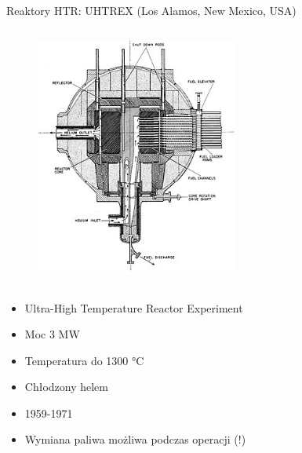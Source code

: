 \begin{columnframe}{Reaktory HTR: UHTREX (Los Alamos, New Mexico, USA)}
    \begin{column}{0.5\textwidth}
        \begin{figure}
            \centering
            \includegraphics[width=0.6\textwidth, frame]{images/UHTREX_core_drawing.jpg}
        \end{figure}
    \end{column}
    \begin{column}{0.5\textwidth}
        \begin{itemize}
            \item Ultra-High Temperature Reactor Experiment
            \item Moc 3 MW
            \item Temperatura do 1300 \si{\degreeCelsius}
            \item Chłodzony helem
            \item 1959-1971
            \item Wymiana paliwa możliwa podczas operacji (!)
        \end{itemize}
    \end{column}
\end{columnframe}


